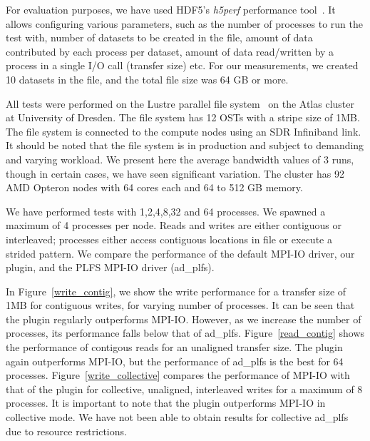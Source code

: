 For evaluation purposes, we have used HDF5's \textit{h5perf} performance tool~\cite{h5perf}. It allows configuring various parameters, such as the number of processes to run the test with, number of datasets to be created in the file, amount of data contributed by each process per dataset, amount of data read/written by a process in a single I/O call (transfer size) etc. For our measurements, we created 10 datasets in the file, and the total file size was 64 GB or more.

All tests were performed on the Lustre parallel file system~\cite{lustre} on the Atlas cluster at University of Dresden. The file system has 12 OSTs with a stripe size of 1MB. The file system is connected to the compute nodes using an SDR Infiniband link. It should be noted that the file system is in production and subject to demanding and varying workload. We present here the average bandwidth values of 3 runs, though in certain cases, we have seen significant variation.
The cluster has 92 AMD Opteron nodes with 64 cores each and 64 to 512 GB memory. 

We have performed tests with 1,2,4,8,32 and 64 processes. We spawned a maximum of 4 processes per node.
Reads and writes are either contiguous or interleaved; processes either access contiguous locations in file or execute a strided pattern.
We compare the performance of the default MPI-IO driver, our plugin, and the PLFS MPI-IO driver (ad\_plfs). 

In Figure~\ref{write_contig}, we show the write performance for a transfer size of 1MB for contiguous writes, for varying number of processes. It can be seen that the plugin regularly outperforms MPI-IO. However, as we increase the number of processes, its performance falls below that of ad\_plfs. Figure~\ref{read_contig} shows the performance of contigous reads for an unaligned transfer size. The plugin again outperforms MPI-IO, but the performance of ad\_plfs is the best for 64 processes. 
Figure~\ref{write_collective} compares the performance of MPI-IO with that of the plugin for collective, unaligned, interleaved writes for a maximum of 8 processes. It is important to note that the plugin outperforms MPI-IO in collective mode. We have not been able to obtain results for collective ad\_plfs due to resource restrictions.   

